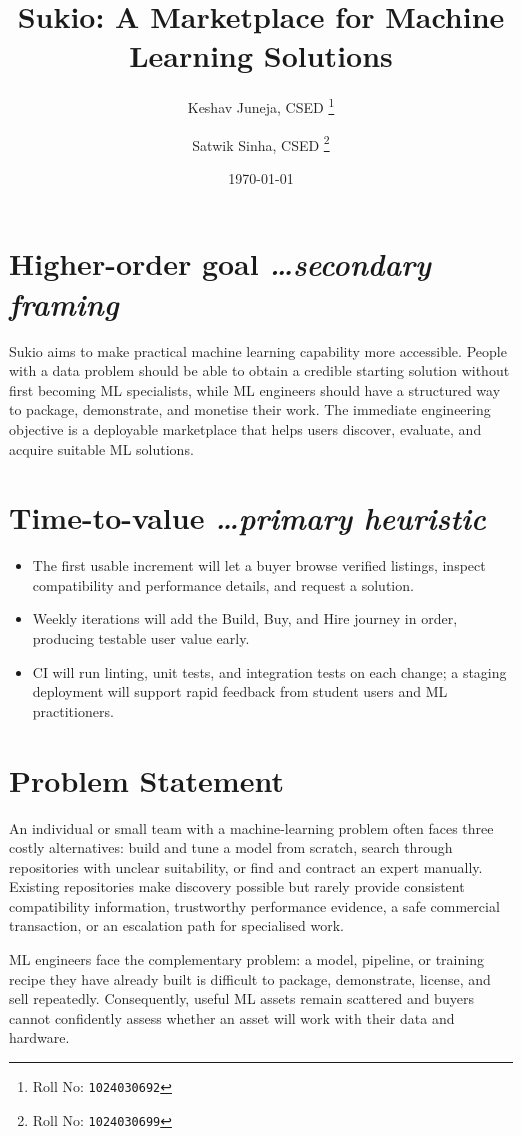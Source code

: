 \documentclass[11pt,a4paper]{article}
\title{Sukio: A Marketplace for Machine Learning Solutions}
\author{
  Keshav Juneja, CSED%
  \thanks{Roll No: \texttt{1024030692}}
  \and
  Satwik Sinha, CSED%
  \thanks{Roll No: \texttt{1024030699}}
}
\date{\today}
\newcommand{\BvrHint}[1]{{\normalfont\normalsize\itshape\hfill #1}}
\begin{document}
\maketitle

\section{Higher-order goal \BvrHint{\ldots secondary framing}}
Sukio aims to make practical machine learning capability more accessible. People with a data problem should be able to obtain a credible starting solution without first becoming ML specialists, while ML engineers should have a structured way to package, demonstrate, and monetise their work. The immediate engineering objective is a deployable marketplace that helps users discover, evaluate, and acquire suitable ML solutions.

\section{Time-to-value \BvrHint{\ldots primary heuristic}}
\begin{itemize}[leftmargin=0.7cm]
  \item The first usable increment will let a buyer browse verified listings, inspect compatibility and performance details, and request a solution.
  \item Weekly iterations will add the Build, Buy, and Hire journey in order, producing testable user value early.
  \item CI will run linting, unit tests, and integration tests on each change; a staging deployment will support rapid feedback from student users and ML practitioners.
\end{itemize}

\section{Problem Statement}
An individual or small team with a machine-learning problem often faces three costly alternatives: build and tune a model from scratch, search through repositories with unclear suitability, or find and contract an expert manually. Existing repositories make discovery possible but rarely provide consistent compatibility information, trustworthy performance evidence, a safe commercial transaction, or an escalation path for specialised work.

ML engineers face the complementary problem: a model, pipeline, or training recipe they have already built is difficult to package, demonstrate, license, and sell repeatedly. Consequently, useful ML assets remain scattered and buyers cannot confidently assess whether an asset will work with their data and hardware.
\end{document}
